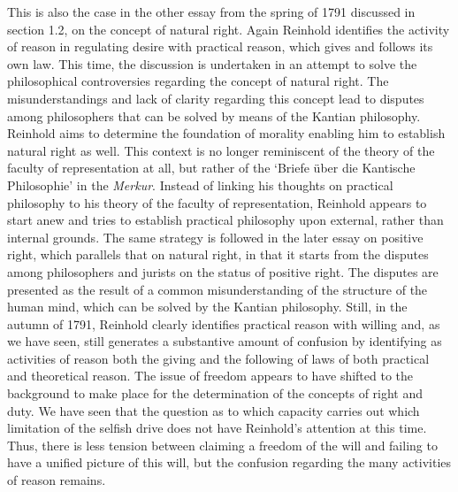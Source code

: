  This is also the case in the other essay from the spring of 1791 discussed in section 1.2, on the concept of natural right. Again Reinhold identifies the activity of reason in regulating desire with practical reason, which gives and follows its own law. This time, the discussion is undertaken in an attempt to solve the philosophical controversies regarding the concept of natural right. The misunderstandings and lack of clarity regarding this concept lead to disputes among philosophers that can be solved by means of the Kantian philosophy. Reinhold aims to determine the foundation of morality enabling him to establish natural right as well. This context is no longer reminiscent of the theory of the faculty of representation at all, but rather of the `Briefe \"{u}ber die Kantische Philosophie' in the \textit{Merkur}. Instead of linking his thoughts on practical philosophy to his theory of the faculty of representation, Reinhold appears to start anew and tries to establish practical philosophy upon external, rather than internal grounds. The same strategy is followed in the later essay on positive right, which parallels that on natural right, in that it starts from the disputes among philosophers and jurists on the status of positive right. The disputes are presented as the result of a common misunderstanding of the structure of the human mind, which can be solved by the Kantian philosophy. Still, in the autumn of 1791, Reinhold clearly identifies practical reason with willing and, as we have seen, still generates a substantive amount of confusion by identifying as activities of reason both the giving and the following of laws of both practical and theoretical reason. The issue of freedom appears to have shifted to the background to make place for the determination of the concepts of right and duty. We have seen that the question as to which capacity carries out which limitation of the selfish drive does not have Reinhold's attention at this time. Thus, there is less tension between claiming a freedom of the will and failing to have a unified picture of this will, but the confusion regarding the many activities of reason remains. 

